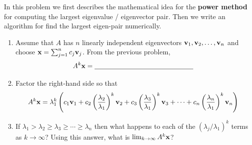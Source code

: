 \begin{problem}
    In this problem  we first describes the mathematical idea for the {\bf power method} for
    computing the largest eigenvalue / eigenvector pair.  Then we write an algorithm for
    find the largest eigen-pair numerically.
    \begin{enumerate}
        \item Assume that $A$ has $n$ linearly independent eigenvectors ${\bf v}_1, {\bf v}_2,
            \dots, {\bf v}_n$ and choose ${\bf x} =
            \sum_{j=1}^n c_j {\bf v}_j$.  From the previous problem,
            \[ A^k {\bf x} = \underline{\hspace{2in}} \]
        \item Factor the right-hand side so that 
            \[ A^k {\bf x} = \lambda_1^k \left( c_1 {\bf v}_1 + c_2 \left(
                \frac{\lambda_2}{\lambda_1} \right)^k {\bf v}_2 + c_3 \left(
                \frac{\lambda_3}{\lambda_1}
                \right)^k {\bf v}_3 + \cdots + c_n \left( \frac{\lambda_n}{\lambda_1}
                \right)^k {\bf v}_n \right) \]
        \item If $\lambda_1 > \lambda_2 \ge \lambda_3 \ge \cdots \ge \lambda_n$ then what
            happens to each of the $(\lambda_j/\lambda_1)^k$ terms as $k \to \infty$?
            Using this answer, what is $\lim_{k \to \infty} A^k {\bf x}$?\\
    \end{enumerate}


\end{problem}
